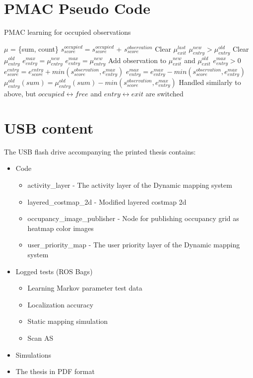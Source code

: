 \chapter{PMAC Pseudo Code}
\label{appendix:pmac_pseudo_code}
\begin{algorithm}
	\caption{PMAC learning for occupied observations}
	\label{al:object_recognition}
	\begin{algorithmic}[1]
		\State $\mu$ = \{sum, count\}
		\State $s_{score}^{occupied} = s_{score}^{occupied}$ + $s_{score}^{observation}$
		\State Clear $\mu_{exit}^{last}$
		\If $\mu_{entry}^{new} > \mu_{entry}^{old}$ 
		\State Clear $\mu_{entry}^{old}$
		\State $e_{entry}^{max} = \mu_{entry}^{new}$
		\Else
		\State $e_{entry}^{max} = \mu_{entry}^{new}$
		\EndIf
		\EndIf
		\State Add observation to $\mu_{exit}^{new}$ and $\mu_{exit}^{old}$
		\If $e_{entry}^{max} > 0$
		\State $e_{score}^{entry} = e_{score}^{entry} + min(s_{score}^{observation},e_{entry}^{max})$
		\State $e_{entry}^{max} = e_{entry}^{max} - min(s_{score}^{observation},e_{entry}^{max})$
		\State $\mu_{entry}^{old}(sum) = \mu_{entry}^{old}(sum) - min(s_{score}^{observation},e_{entry}^{max})$
		\EndIf
		\EndIf
			\State Handled similarly to above, but $occupied \leftrightarrow free$ and $entry \leftrightarrow exit$ are switched
		\EndIf
		\EndFor
	\end{algorithmic}
\end{algorithm}


\chapter{USB content}
\label{appendix:usb_content}
The USB flash drive accompanying the printed thesis contains:

\begin{itemize}
	\item Code 
	\begin{itemize}
		\item activity\_layer - The activity layer of the Dynamic mapping system
		\item layered\_costmap\_2d - Modified layered costmap 2d
		\item occupancy\_image\_publisher - Node for publishing occupancy grid as heatmap color images
		\item user\_priority\_map - The user priority layer of the Dynamic mapping system
	\end{itemize}
	\item Logged tests (ROS Bags)
	\begin{itemize}
		\item Learning Markov parameter test data
		\item Localization accuracy
		\item Static mapping simulation
		\item Scan AS
	\end{itemize}
	\item Simulations
	\item The thesis in PDF format
\end{itemize}